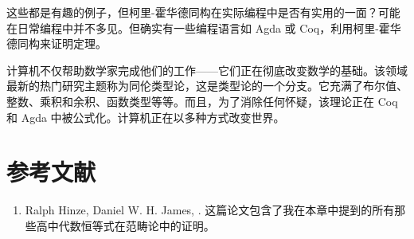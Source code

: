 这些都是有趣的例子，但柯里-霍华德同构在实际编程中是否有实用的一面？可能在日常编程中并不多见。但确实有一些编程语言如 Agda 或 Coq，利用柯里-霍华德同构来证明定理。

计算机不仅帮助数学家完成他们的工作——它们正在彻底改变数学的基础。该领域最新的热门研究主题称为同伦类型论，这是类型论的一个分支。它充满了布尔值、整数、乘积和余积、函数类型等等。而且，为了消除任何怀疑，该理论正在 Coq 和 Agda 中被公式化。计算机正在以多种方式改变世界。

\section{参考文献}

\begin{enumerate}
  \tightlist
  \item
  Ralph Hinze, Daniel W. H. James,
  . 这篇论文包含了我在本章中提到的所有那些高中代数恒等式在范畴论中的证明。
\end{enumerate}
